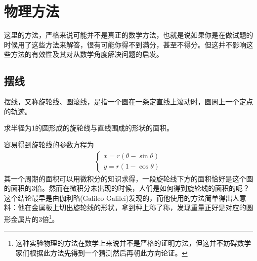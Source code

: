 
\section{物理方法}
\label{sec:math-by-physics}

这里的方法，严格来说可能并不是真正的数学方法，也就是说如果你是在做试题的时候用了这些方法来解答，很有可能你得不到满分，甚至不得分。但这并不影响这些方法的有效性及其对从数学角度解决问题的启发。

\subsection{摆线}
\label{sec:cycloid}

\begin{definition}[摆线，Cycloid]
  摆线，又称旋轮线、圆滚线，是指一个圆在一条定直线上滚动时，圆周上一个定点的轨迹。
\end{definition}

\begin{example}[旋轮线的面积]
  求半径为1的圆形成的旋轮线与直线围成的形状的面积。
  \begin{center}
  \end{center}

  容易得到旋轮线的参数方程为
  \begin{align*}
    \begin{cases}
      x= r(\theta - \sin\theta)\\
      y= r(1      - \cos\theta)
    \end{cases}
  \end{align*}
  其一个周期的面积可以用微积分的知识求得，一段旋轮线下方的面积恰好是这个圆的面积的3倍。然而在微积分未出现的时候，人们是如何得到旋轮线的面积的呢？这个结论最早是由伽利略(Galileo Galilei)发现的，而他使用的方法简单得出人意料：他在金属板上切出旋轮线的形状，拿到秤上称了称，发现重量正好是对应的圆形金属片的3倍\footnote{这种实验物理的方法在数学上来说并不是严格的证明方法，但这并不妨碍数学家们根据此方法先得到一个猜测然后再朝此方向论证。}。
\end{example}

